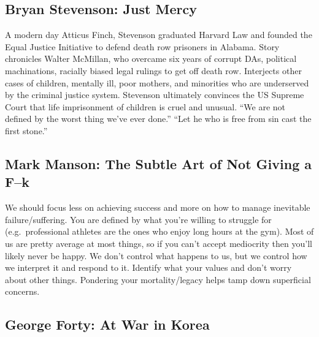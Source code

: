 \documentclass[
]{article}
\begin{document}
\hypertarget{bryan-stevenson-just-mercy}{%
\subsection{Bryan Stevenson: Just
Mercy}\label{bryan-stevenson-just-mercy}}

A modern day Atticus Finch, Stevenson graduated Harvard Law and founded
the Equal Justice Initiative to defend death row prisoners in Alabama.
Story chronicles Walter McMillan, who overcame six years of corrupt DAs,
political machinations, racially biased legal rulings to get off death
row. Interjects other cases of children, mentally ill, poor mothers, and
minorities who are underserved by the criminal justice system. Stevenson
ultimately convinces the US Supreme Court that life imprisonment of
children is cruel and unusual. ``We are not defined by the worst thing
we've ever done.'' ``Let he who is free from sin cast the first stone.''

\hypertarget{mark-manson-the-subtle-art-of-not-giving-a-fk}{%
\subsection{Mark Manson: The Subtle Art of Not Giving a
F--k}\label{mark-manson-the-subtle-art-of-not-giving-a-fk}}

We should focus less on achieving success and more on how to manage
inevitable failure/suffering. You are defined by what you're willing to
struggle for (e.g.~professional athletes are the ones who enjoy long
hours at the gym). Most of us are pretty average at most things, so if
you can't accept mediocrity then you'll likely never be happy. We don't
control what happens to us, but we control how we interpret it and
respond to it. Identify what your values and don't worry about other
things. Pondering your mortality/legacy helps tamp down superficial
concerns.

\hypertarget{george-forty-at-war-in-korea}{%
\subsection{George Forty: At War in
Korea}\label{george-forty-at-war-in-korea}}
\end{document}
